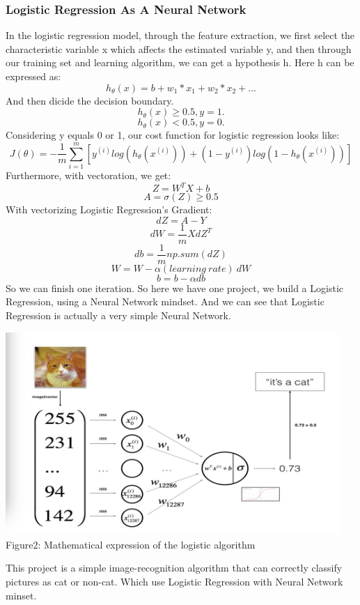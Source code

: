 \documentclass[a4paper]{article}
\begin{document}
\subsubsection{\textbf{Logistic Regression As A Neural Network}}

In the logistic regression model, through the feature extraction, we  first select the characteristic variable x which affects the estimated variable y, and then through our training set and learning algorithm, we can get a hypothesis h. Here h can be expressed as:$$h_\theta(x)=b+w_1*x_1+w_2*x_2+...$$
And then dicide the decision boundary.
$$h_\theta(x)\ge0.5,y=1.$$
	$$h_\theta(x)<0.5,y=0.$$
Considering y equals 0 or 1, our cost function for logistic regression looks like:$$J(\theta)=-\frac{1}{m}\sum_{i=1}^m[y^{(i)}log(h_\theta(x^{(i)}))+(1-y^{(i)})log(1-h_\theta(x^{(i)}))]$$
Furthermore, with vectoration, we get:
$$Z=W^TX+b$$
$$A=\sigma(Z)\ge0.5$$
With vectorizing Logistic Regression's Gradient:
$$dZ=A-Y$$
$$dW=\frac{1}{m}XdZ^T$$
$$db=\frac{1}{m}np.sum(dZ)$$
$$W=W-\alpha (learning \ rate)\ dW$$
$$b=b-\alpha db$$
So we can finish one iteration. So here we have one project, we build a Logistic Regression, using a Neural Network mindset. And we can see that Logistic Regression is actually a very simple Neural Network.

\begin{center}
\includegraphics[width=5in]{logi.png}\\
Figure2: Mathematical expression of the logistic algorithm
\end{center}

This project is a simple image-recognition algorithm that can correctly classify pictures as cat or non-cat. Which use Logistic Regression with Neural Network minset.
\end{document}
